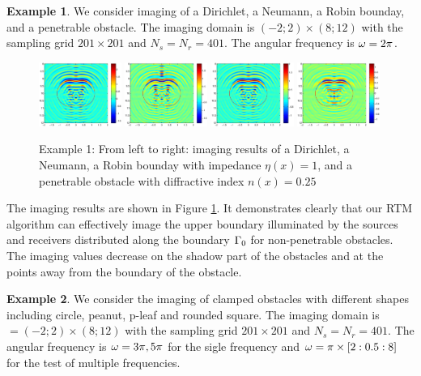 \documentclass[11pt]{iopart}
\begin{document}
\bigskip
\textbf{Example 1}.
We consider imaging of a Dirichlet, a Neumann, a Robin bounday, and a penetrable obstacle. The imaging domain is $(−2; 2) \times (8; 12)$ with the sampling grid $201 \times 201$ and $N_s = N_r = 401$. The angular frequency is $\omega=2\pi$.
 \begin{figure}
 	\centering
 	\includegraphics[width=0.24\textwidth]{./graphic/peanut_3pi.eps}
 	\includegraphics[width=0.24\textwidth]{./graphic/peanut_3pi_neumann.eps}
 	\includegraphics[width=0.24\textwidth]{./graphic/peanut_3pi_impedance_1.eps}
 	\includegraphics[width=0.24\textwidth]{./graphic/peanut_3pi_transmission.eps}
 	\caption{Example 1: From left to right: imaging results of a Dirichlet, a Neumann, a Robin bounday with impedance $\eta(x)=1$, and a penetrable obstacle with diffractive index $n(x)=0.25$}\label{figure_1}
 \end{figure}
 
 The imaging results are shown in Figure \ref{figure_1}. It demonstrates clearly that our RTM
 algorithm can effectively image the upper boundary illuminated by the sources and
 receivers distributed along the boundary $\Gamma_0$ for non-penetrable obstacles. The imaging
 values decrease on the shadow part of the obstacles and at the points away from the
 boundary of the obstacle.

\bigskip
\textbf{Example 2}. We consider the imaging of clamped obstacles with different shapes including circle, peanut, p-leaf and rounded square. The imaging domain is $ = (−2; 2) \times (8; 12)$ with the sampling grid $201 \times 201$ and $N_s = N_r = 401$. The angular frequency is $\omega = 3\pi,5\pi$ for the sigle frequency and $\omega=\pi\times[2:0.5:8]$ for the test of multiple frequencies.
\end{document}
